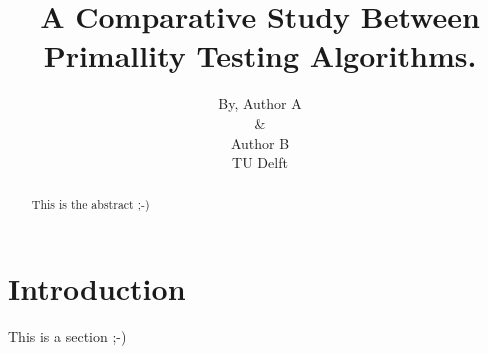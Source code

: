 \documentclass[compressed,final,notitlepage,narroweqnarray,inline,twoside,]{ieee}
\title[TITLE]{A Comparative Study Between Primallity Testing Algorithms.}
\author{By, Author A\\ \& \\ Author B \\ TU Delft}
\begin{document}
\maketitle

\begin{abstract}
This is the abstract ;-) 
\end{abstract}

\section{Introduction}
This is a section ;-)


 
\end{document}
